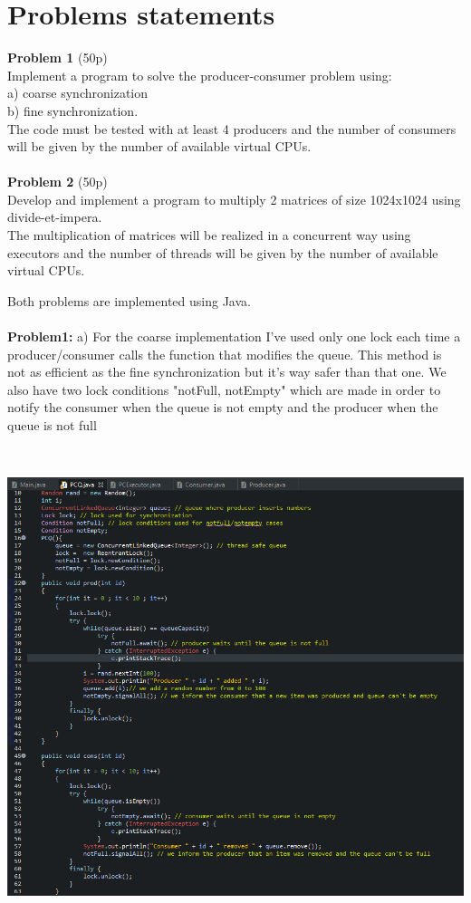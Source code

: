 \documentclass[14pt]{article}
\begin{document}
\section*{Problems statements}
\vspace{20 mm}
\textbf{Problem 1} (50p) \\
Implement a program to solve the producer-consumer problem using:\\
a) coarse synchronization\\
b) fine synchronization.\\
The code must be tested with at least 4 producers and the number of consumers will be given by the number of available virtual CPUs.
\\\vspace{10 mm}\\
\textbf{Problem 2} (50p) \\
Develop and implement a program to multiply 2 matrices of size 1024x1024 using divide-et-impera.\\
The multiplication of matrices will be realized in a concurrent way using executors and the number of threads will be given by the number of available virtual CPUs.
\begin{center}
\end{center}
\newpage
Both problems are implemented using Java.
\\\vspace{10 mm}\\
\textbf{Problem1:} a) For the coarse implementation I've used only one lock each time a producer/consumer calls the function that modifies the queue. This method is not as efficient as the fine synchronization but it's way safer than that one. We also have two lock conditions "notFull, notEmpty" which are made in order to notify the consumer when the queue is not empty and the producer when the queue is not full\\
\includegraphics[height=5.8in, width = 5.5in]{coarse.png}\\
\end{document}
